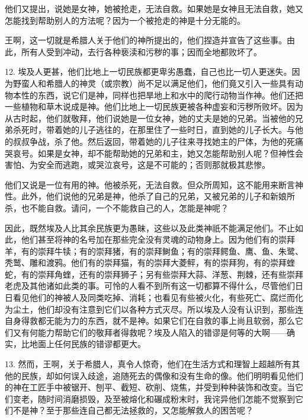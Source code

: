 他们又提出，说她是女神，她被抢走，无法自救。如果她是女神且无法自救，她又怎能找到帮助别人的方法呢？因为一个被抢走的神是十分无能的。\par

王啊，这一切就是希腊人关于他们的神所提出的，他们捏造并宣告了这些事。由此，所有人受到冲动，去行各种亵渎和污秽的事；因而全地都败坏了。\par

12. 埃及人更甚，他们比地上一切民族都更卑劣愚蠢，自己也比一切人更迷失。因为野蛮人和希腊人的神灵（或宗教）尚不足以满足他们，他们竟又引入一些具有动物本性的东西，说它们是神，同样也把旱地上和水中的爬行动物当作神。他们还把一些植物和草木说成是神。他们比地上一切民族更被各种虚妄和污秽所败坏。因为从古时起，他们就敬拜，他们说她是一位女神，她的丈夫是她的兄弟。当被他的兄弟杀死时，带着她的儿子逃往的，在那里住了一些时日，直到她的儿子长大。与他的叔叔争战，杀了他。然后返回，带着她的儿子往来寻找她主的尸体，为他的死痛哭哀号。如果是女神，却不能帮助她的兄弟和主，她又怎能帮助别人呢？但神性会害怕、为安全而逃跑，或哭泣哀号，这是不可能的；否则那就极其悲惨。\par

他们又说是一位有用的神。他被杀死，无法自救。但众所周知，这不能用来断言神性。此外，他们说他的兄弟是神，他杀了自己的兄弟，又被兄弟的儿子和新娘所杀，也不能自救。请问，一个不能救自己的人，怎能是神呢？\par

因此，既然埃及人比其余民族更为愚昧，这些以及此类神祇不能满足他们。不止如此，他们甚至将神的名号加在那些完全没有灵魂的动物身上。因为他们有的崇拜羊，有的崇拜牛犊；有的崇拜猪，有的崇拜鲥鱼；有的崇拜鳄鱼、鹰、鱼、朱鹭、秃鹫、雕和渡鸦。他们有的崇拜猫，有的崇拜大菱鲆，有的崇拜狗，有的崇拜蝰蛇，有的崇拜角蝰，还有的崇拜狮子；另有些崇拜大蒜、洋葱、荆棘，还有些崇拜老虎及其他诸如此类的事。可怜的人看不到所有这一切都算不得什么，尽管他们日日看见他们的神被人及同类吃掉、消耗；也看见有些被火化，有些死亡、腐烂而化为尘土，他们却没有注意到它们以各种方式灭尽。所以埃及人没有认识到，那些连自身得救都无能为力的东西，就不是神。如果它们在自救的事上尚且软弱，那么它们又有何能力帮助它们的敬拜者得救呢？埃及人陷入的错谬是何等的大啊——确实，比地面上任何民族的错谬都更大。\par

13. 然而，王啊，关于希腊人，真令人惊奇，他们在生活方式和理智上超越所有其他的民族，却如何误入歧途，追随死去的偶像和没有生命的像。他们明明看见他们的神在工匠手中被锯开、刨平、截短、砍削、烧焦，并受到种种装饰和改变。当它们变老，随时间消磨损毁，及至被熔化和碾成粉末时，我诧异他们怎能不觉察到它们不是神？至于那些连自己都无法拯救的，又怎能解救人的困苦呢？\par

